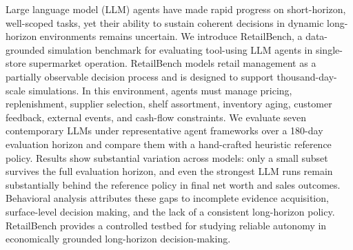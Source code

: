Large language model (LLM) agents have made rapid progress on short-horizon, well-scoped tasks, yet their ability to sustain coherent decisions in dynamic long-horizon environments remains uncertain. 
We introduce RetailBench, a data-grounded simulation benchmark for evaluating tool-using LLM agents in single-store supermarket operation. 
RetailBench models retail management as a partially observable decision process and is designed to support thousand-day-scale simulations. In this environment, agents must manage pricing, replenishment, supplier selection, shelf assortment, inventory aging, customer feedback, external events, and cash-flow constraints. 
We evaluate seven contemporary LLMs under representative agent frameworks over a 180-day evaluation horizon and compare them with a hand-crafted heuristic reference policy. 
Results show substantial variation across models: only a small subset survives the full evaluation horizon, and even the strongest LLM runs remain substantially behind the reference policy in final net worth and sales outcomes. 
Behavioral analysis attributes these gaps to incomplete evidence acquisition, surface-level decision making, and the lack of a consistent long-horizon policy. 
RetailBench provides a controlled testbed for studying reliable autonomy in economically grounded long-horizon decision-making.